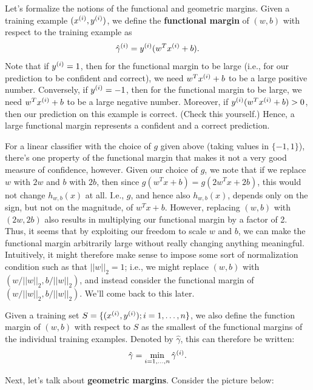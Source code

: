 \documentclass{article}
\begin{document}
Let's formalize the notions of the functional and geometric margins.  Given a training example
$({x^{(i)}}, {y^{(i)}})$, we define the {\bf functional margin} of $(w,b)$ with respect to the
training example as
\[
\hat\gamma^{(i)} = {y^{(i)}} (w^T {x^{(i)}} + b).
\]
Note that if ${y^{(i)}} = 1$, then for the functional margin to be large (i.e., for our prediction
to be confident and correct), we need $w^T {x^{(i)}} + b$ to be a large positive number.
Conversely, if ${y^{(i)}} = -1$, then for the functional margin to be large, we need $w^T {x^{(i)}} + b$
to be a large negative number.  Moreover, if
${y^{(i)}} (w^T {x^{(i)}} + b) > 0$, then our prediction on this example is correct.  (Check this yourself.)
Hence, a large functional margin represents a confident and a correct prediction.

For a linear classifier with the choice of $g$ given above (taking values in $\{-1,1\}$),
there's one property of the functional margin that makes it not a very good measure of confidence,
however.  Given our choice of $g$, we note that if we replace $w$ with $2w$ and
$b$ with $2b$, then since
$g(w^Tx + b) = g(2w^Tx + 2b)$, this would not change $h_{w,b}(x)$ at all.  I.e., $g$, and hence
also $h_{w,b}(x)$, depends
only on the sign, but not on the magnitude, of $w^Tx+b$.  However, replacing $(w,b)$ with
$(2w,2b)$ also results in multiplying our functional margin by a factor of 2.  Thus, it seems
that by exploiting our freedom to scale $w$ and $b$, we can make the functional margin arbitrarily
large without really changing anything meaningful.  Intuitively, it might therefore make sense
to impose some sort of normalization condition such as that $||w||_2 = 1$; i.e., we might
replace $(w,b)$ with $(w/||w||_2,b/||w||_2)$, and instead consider the functional margin of
$(w/||w||_2,b/||w||_2)$.  We'll come back to this later.

Given a training set $S = \{({x^{(i)}},{y^{(i)}});i=1,\ldots,{n}\}$, we also define the function
margin of $(w,b)$ with respect to $S$ as the smallest of the functional margins of
the individual training examples.  Denoted
by $\hat\gamma$, this can therefore be written:
\[
\hat\gamma = \min_{i=1,\ldots,{n}} \hat\gamma^{(i)}.
\]

Next, let's talk about {\bf geometric margins}.  Consider the picture below:
\end{document}
